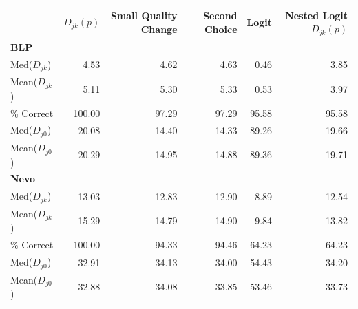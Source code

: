 \begin{tabular}{lrrrrr}
\midrule
                                              &   $ D_{jk}(p) $ &   Small Quality Change &   Second Choice &   Logit &   Nested Logit $ D_{jk}(p) $ \\
\midrule
 \textbf{BLP} \\ \midrule Med($D_{jk}$)         &            4.53 &                   4.62 &            4.63 &    0.46 &                         3.85 \\
 Mean($D_{jk}$)                               &            5.11 &                   5.30 &            5.33 &    0.53 &                         3.97 \\
 \% Correct                                   &          100.00 &                  97.29 &           97.29 &   95.58 &                        95.58 \\
 \midrule Med($D_{j0}$)                         &           20.08 &                  14.40 &           14.33 &   89.26 &                        19.66 \\
 Mean($D_{j0}$)                               &           20.29 &                  14.95 &           14.88 &   89.36 &                        19.71 \\
 \midrule \textbf{Nevo} \\ \midrule Med($D_{jk}$) &           13.03 &                  12.83 &           12.90 &    8.89 &                        12.54 \\
 Mean($D_{jk}$)                               &           15.29 &                  14.79 &           14.90 &    9.84 &                        13.82 \\
 \% Correct                                   &          100.00 &                  94.33 &           94.46 &   64.23 &                        64.23 \\
 \midrule Med($D_{j0}$)                         &           32.91 &                  34.13 &           34.00 &   54.43 &                        34.20 \\
 Mean($D_{j0}$)                               &           32.88 &                  34.08 &           33.85 &   53.46 &                        33.73 \\
\midrule
\end{tabular}